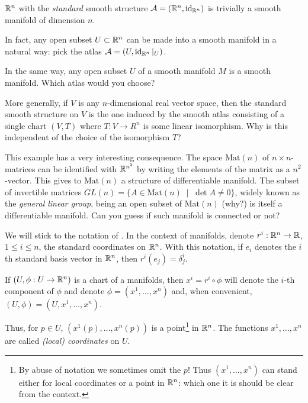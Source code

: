 \begin{exe}\label{exe:subsetsmanifolds}
  $\mathbb{R}^n$ with the \emph{standard} smooth structure $\mathcal{A}=(\mathbb{R}^n, \operatorname{id}_{\mathbb{R}^n})$ is trivially a smooth manifold of dimension $n$.

  In fact, any open subset $U\subset\mathbb{R}^n$ can be made into a smooth manifold in a natural way: pick the atlas $\mathcal{A}=(U, \operatorname{id}_{\mathbb{R}^n}|_U)$.

  In the same way, any open subset $U$ of a smooth manifold $M$ is a smooth manifold.
  Which atlas would you choose?

  More generally, if $V$ is any $n$-dimensional real vector space, then the standard smooth structure on $V$ is the one induced by the smooth atlas consisting of a single chart $(V, T)$ where $T: V \to R^n$ is some linear isomorphism. Why is this independent of the choice of the isomorphism $T$?

  This example has a very interesting consequence.
  The space $\mathrm{Mat}(n)$ of $n\times n$-matrices can be identified with $\mathbb{R}^{n^2}$ by writing the elements of the matrix as a $n^2$-vector.
  This gives to $\mathrm{Mat}(n)$ a structure of differentiable manifold.
  The subset of invertible matrices $GL(n) = \{ A \in \mathrm{Mat}(n) \;\mid\; \det A \neq 0\}$, widely known as the \emph{general linear group}, being an open subset of $\mathrm{Mat}(n)$ (why?) is itself a differentiable manifold.
Can you guess if such manifold is connected or not?
\end{exe}

\begin{ntn}
  We will stick to the notation of \cite{book:tu}.
  In the context of manifolds, denote $r^i: \mathbb{R}^n\to\mathbb{R}$, $1\leq i\leq n$, the standard coordinates on $\mathbb{R}^n$. With this notation, if $e_i$ denotes the $i$th standard basis vector in $\mathbb{R}^n$, then $r^i(e_j) = \delta^i_j$.

  If $(U, \phi:U\to\mathbb{R}^n)$ is a chart of a manifolds, then $x^i = r^i\circ\phi$ will denote the $i$-th component of $\phi$ and denote $\phi = (x^1, \ldots, x^n)$ and, when convenient, $(U,\phi) = (U, x^1, \ldots, x^n)$.

  Thus, for $p\in U$, $(x^1(p), \ldots, x^n(p))$ is a point\footnote{By abuse of notation we sometimes omit the $p$! Thus $(x^1, \ldots, x^n)$ can stand either for local coordinates or a point in $\mathbb{R}^n$: which one it is should be clear from the context.} in $\mathbb{R}^n$. The functions $x^1, \ldots, x^n$  are called \emph{(local) coordinates} on $U$.
\end{ntn}

